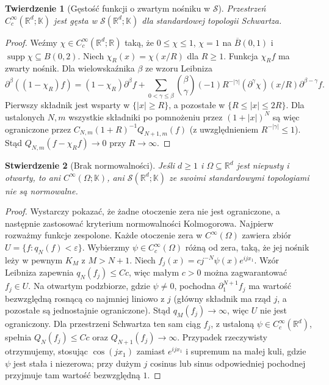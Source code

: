 \documentclass[11pt,a4paper]{article}
\numberwithin{equation}{section}
\theoremstyle{plain}
\newtheorem{twierdzenie}{Twierdzenie}[section]
\newtheorem{stwierdzenie}[twierdzenie]{Stwierdzenie}
\theoremstyle{definition}
\theoremstyle{remark}
\newcommand{\R}{\mathbb R}
\newcommand{\K}{\mathbb K}
\begin{document}
\begin{twierdzenie}[Gęstość funkcji o zwartym nośniku w $\mathcal S$]
\label{thm:density-schwartz17}
Przestrzeń $C_c^\infty(\R^d;\K)$ jest gęsta w
$\mathcal S(\R^d;\K)$ dla standardowej topologii Schwartza.
\end{twierdzenie}
\begin{proof}
Weźmy $\chi\in C_c^\infty(\R^d;\R)$ taką, że
$0\le\chi\le1$, $\chi=1$ na $\overline B(0,1)$
i $\operatorname{supp}\chi\subseteq B(0,2)$.
Niech $\chi_R(x)=\chi(x/R)$ dla $R\ge1$.
Funkcja $\chi_R f$ ma zwarty nośnik. Dla wielowskaźnika $\beta$
ze wzoru Leibniza
\[
\partial^\beta((1-\chi_R)f)
=(1-\chi_R)\partial^\beta f+
\sum_{0<\gamma\le\beta}\binom{\beta}{\gamma}
 (-1)R^{-|\gamma|}(\partial^\gamma\chi)(x/R)
 \partial^{\beta-\gamma}f.
\]
Pierwszy składnik jest wsparty w $\{|x|\ge R\}$,
a pozostałe w $\{R\le|x|\le2R\}$.
Dla ustalonych $N,m$ wszystkie składniki po pomnożeniu przez
$(1+|x|)^N$ są więc ograniczone przez
$C_{N,m}(1+R)^{-1}Q_{N+1,m}(f)$
(z uwzględnieniem $R^{-|\gamma|}\le1$).
Stąd $Q_{N,m}(f-\chi_Rf)\to0$ przy $R\to\infty$.
\end{proof}

\begin{stwierdzenie}[Brak normowalności]
\label{prop:non-normable17}
Jeśli $d\ge1$ i $\Omega\subseteq\R^d$ jest niepusty i otwarty,
to ani $C^\infty(\Omega;\K)$, ani $\mathcal S(\R^d;\K)$
ze swoimi standardowymi topologiami nie są normowalne.
\end{stwierdzenie}
\begin{proof}
Wystarczy pokazać, że żadne otoczenie zera nie jest ograniczone,
a następnie zastosować kryterium normowalności Kolmogorowa.
Najpierw rozważmy funkcje zespolone. Każde otoczenie zera
w $C^\infty(\Omega)$ zawiera zbiór $U=\{f:q_N(f)<\varepsilon\}$.
Wybierzmy $\psi\in C_c^\infty(\Omega)$ różną od zera,
taką, że jej nośnik leży w pewnym $K_M$ z $M>N+1$.
Niech $f_j(x)=c j^{-N}\psi(x)e^{ijx_1}$.
Wzór Leibniza zapewnia $q_N(f_j)\le Cc$,
więc małym $c>0$ można zagwarantować $f_j\in U$.
Na otwartym podzbiorze, gdzie $\psi\ne0$, pochodna
$\partial_1^{N+1}f_j$ ma wartość bezwzględną rosnącą
co najmniej liniowo z $j$ (główny składnik ma rząd $j$,
a pozostałe są jednostajnie ograniczone). Stąd
$q_M(f_j)\to\infty$, więc $U$ nie jest ograniczony.
Dla przestrzeni Schwartza ten sam ciąg $f_j$, z ustaloną
$\psi\in C_c^\infty(\R^d)$, spełnia
$Q_N(f_j)\le Cc$ oraz $Q_{N+1}(f_j)\to\infty$.
Przypadek rzeczywisty otrzymujemy, stosując
$\cos(jx_1)$ zamiast $e^{ijx_1}$ i supremum na małej kuli,
gdzie $\psi$ jest stała i niezerowa; przy dużym $j$
cosinus lub sinus odpowiedniej pochodnej przyjmuje tam
wartość bezwzględną $1$.
\end{proof}
\end{document}
